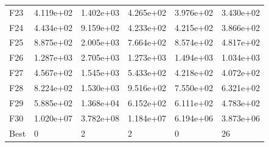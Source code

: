 \begin{tabular}{llllll}
F23  &  4.119e+02 &  1.402e+03 &  4.265e+02 &  3.976e+02 &  3.430e+02 \\
F24  &  4.434e+02 &  9.159e+02 &  4.233e+02 &  4.215e+02 &  3.866e+02 \\
F25  &  8.875e+02 &  2.005e+03 &  7.664e+02 &  8.574e+02 &  4.817e+02 \\
F26  &  1.287e+03 &  2.705e+03 &  1.273e+03 &  1.494e+03 &  1.034e+03 \\
F27  &  4.567e+02 &  1.545e+03 &  5.433e+02 &  4.218e+02 &  4.072e+02 \\
F28  &  8.224e+02 &  1.530e+03 &  9.516e+02 &  7.550e+02 &  6.321e+02 \\
F29  &  5.885e+02 &  1.368e+04 &  6.152e+02 &  6.111e+02 &  4.783e+02 \\
F30  &  1.020e+07 &  3.782e+08 &  1.184e+07 &  6.194e+06 &  3.873e+06 \\
Best &          0 &          2 &          2 &          0 &         26 \\
\bottomrule
\end{tabular}
